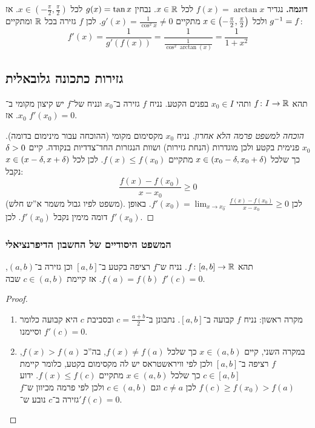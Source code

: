\documentclass[name=רשימות חשבון דיפרנציאלי ואינטגרלי 1א]{../../../tex/classes/megasumPreamble}
\begin{document}
	\textbf{דוגמה. }נגדיר $f(x) = \arctan x$ לכל $x \in \mathbb{R}$. נבחין $g(x) = \tan x$ לכל $x \in (-\frac{\pi}{2}, \frac{\pi}{2})$. אז $g^{-1} = f$ ולכל $x \in \left ( -\frac{\pi}{2}, \frac{\pi}{2} \right )$ מתקיים $g'(x) = \frac{1}{\cos^{2}x}\neq 0$. לכן $f$ גזירה בכל $\mathbb{R}$ ומתקיים:
	\[ f'(x) = \frac{1}{g'(f(x))} = \frac{1}{\frac{1}{\cos^{2}\arctan(x)}} = \frac{1}{1 + x^{2}} \]

	\subsection{גזירות כתכונה גלובאלית}

	\begin{Theorem}
		תהא $f \colon I \to \mathbb{R}$ ותהי $x_0 \in I$ בפנים הקטע. נניח $f$ גזירה ב־$x_0$ ונניח של־$f$ יש קיצון מקומי ב־$x_0$. אז $f'(x_0) = 0$.
	\end{Theorem}
	\begin{proof}[הוכחה למשפט פרמה הלא אחרון]
		נניח $x_0$ מקסימום מקומי (ההוכחה עבור מינימום בדומה). $x_0$ פנימית בקטע ולכן מוגדרות (הנחת גזירות) ושוות הנגזרות החד־צדדיות בנקודה. קיים $\delta > 0$ כך שלכל $x \in (x_0 - \delta, x_0 + \delta)$ מתקיים $f(x) \le f(x_0)$. לכן לכל $x \in (x - \delta, x + \delta)$ נקבל:
		\[ \frac{f(x) - f(x_0)}{x - x_0} \ge 0 \]
		(משפט לפיו גבול משמר א''ש חלש). לכן $f'(x_0) = \lim_{x \to x_0^{-}} \frac{f(x) - f(x_0)}{x - x_0} \ge 0$. באופן דומה מימין נקבל $f'(x_0)$. לכן $f'(x_0)$.
	\end{proof}

	\subsubsection{המשפט היסודיים של החשבון הדיפרנציאלי}
	\begin{Theorem}
		תהא $f \colon [a, b] \to \mathbb{R}$. נניח ש־$f$ רציפה בקטע ב־$[a, b]$ וכן גזירה ב־$(a, b)$, $f(a) = f(b)$. אז קיימת $c \in (a, b)$ שבה $f'(c) = 0$.
	\end{Theorem}
	\begin{proof}
		\begin{enumerate}
			\item מקרה ראשון: נניח $f$ קבועה ב־$[a, b]$. נתבונן ב־$c = \frac{a + b}{2}$ ובסביבת  $c$ היא קבועה כלומר $f'(c) =0$ וסיימנו.
			\item במקרה השני, קיים $x \in (a, b)$ כך שלכל $f(x) \ne f(a)$, בה''כ $f(x) > f(a)$, $f$ רציפה ב־$[a, b]$ ולכן לפי וויראשטראס יש לה מקסימום בקטע, כלומר קיימת $c \in [a, b]$ כך שלכל $x \in (a, b)$ מתקיים $f(x) \le f(c)$. ידוע $f(c) \ge f(x_0) > f(a)$ לכן $c \neq a$ וגם $c \in (a, b)$ ולכן לפי פרמה מכיוון ש־$f$ גזירה ב־$c$ נובע ש־$'f(c) = 0$.
		\end{enumerate}
	\end{proof}
\end{document}
